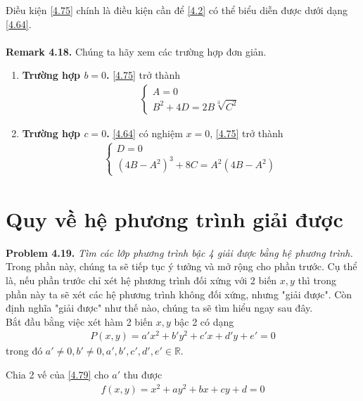\documentclass[a4paper,oneside]{book}
\numberwithin{equation}{chapter}
\begin{document}
Điều kiện \eqref{4.75} chính là điều kiện cần để \eqref{4.2} có thể biểu diễn được dưới dạng \eqref{4.64}.\\
\\
\textbf{Remark 4.18.} Chúng ta hãy xem các trường hợp đơn giản.
\begin{enumerate}
\item \textbf{Trường hợp $b=0$.} \eqref{4.75} trở thành 
\begin{align}
\left\{ {\begin{array}{*{20}{c}}
{A = 0}\\
{{B^2} + 4D = 2B\sqrt[3]{{{C^2}}}}
\end{array}} \right.
\end{align}
\item \textbf{Trường hợp $c=0$.} \eqref{4.64} có nghiệm $x=0$, \eqref{4.75} trở thành
\begin{align}
\left\{ {\begin{array}{*{20}{c}}
{D = 0}\\
{{{\left( {4B - {A^2}} \right)}^3} + 8C = {A^2}\left( {4B - {A^2}} \right)}
\end{array}} \right.
\end{align}
\end{enumerate}
\section{Quy về hệ phương trình giải được}
\textbf{Problem 4.19.} \textit{Tìm các lớp phương trình bậc 4 giải được bằng hệ phương trình.}\\

Trong phần này, chúng ta sẽ tiếp tục ý tưởng và mở rộng cho phần trước. Cụ thể là, nếu phần trước chỉ xét hệ phương trình đối xứng với 2 biến $x,y$ thì trong phần này ta sẽ xét các hệ phương trình không đối xứng, nhưng "giải được". Còn định nghĩa "giải được" như thế nào, chúng ta sẽ tìm hiểu ngay sau đây.\\

Bắt đầu bằng việc xét hàm 2 biến $x,y$ bậc 2 có dạng
\begin{align}
\label{4.79}
P\left( {x,y} \right) = a'{x^2} + b'{y^2} + c'x + d'y + e' = 0
\end{align}
trong đó $a' \ne 0,b' \ne 0,a',b',c',d',e' \in \mathbb{R}$.

Chia 2 vế của \eqref{4.79} cho $a'$ thu được
\begin{align}
\label{4.80}
f\left( {x,y} \right) = {x^2} + a{y^2} + bx + cy + d = 0
\end{align}
\end{document}
